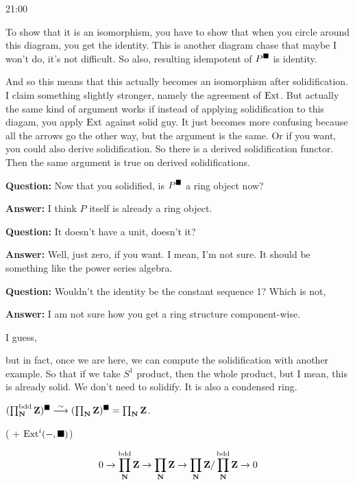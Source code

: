 \begin{unfinished}{21:00}
\begin{sketch}
To show that it is an isomorphism, you have to show that when you circle around this diagram, you get the identity. This is another diagram chase that maybe I won't do, it's not difficult. So also, resulting idempotent of $P^\blacksquare$ is identity.

And so this means that this actually becomes an isomorphism after solidification. 
I claim something slightly stronger, namely the agreement of $\operatorname{Ext}$. But actually the same kind of argument works if instead of applying solidification to this diagam, you apply $\operatorname{Ext}$ against solid guy. 
It just becomes more confusing because all the arrows go the other way, but the argument is the same. 
Or if you want, you could also derive solidification. 
So there is a derived solidification functor. Then the same argument is true on derived solidifications. 

% 
\textbf{Question:} Now that you solidified, is $P^\blacksquare$ a ring object now? 

\textbf{Answer:} I think $P$ itself is already a ring object. 

\textbf{Question:} It doesn't have a unit, doesn't it? 

\textbf{Answer:} Well, just zero, if you want. I mean, I'm not sure. It should be something like the power series algebra.

\textbf{Question:} Wouldn't the identity be the constant sequence 1? Which is not,

\textbf{Answer:}  I am not sure how you get a ring structure component-wise.


I guess, 

but in fact, once we are here, we can compute the solidification with another example. So that if we take $S^1$ product, then the whole product, but I mean, this is already solid. We don't need to solidify. It is also a condensed ring.


\begin{lemma}

$ (\prod_\mathbf N^{\mathrm{bdd}} \mathbf Z)^\blacksquare \overset\sim\longrightarrow (\prod_\mathbf N \mathbf Z)^\blacksquare = \prod_\mathbf N \mathbf Z$.

( + $\operatorname{Ext}^i(-,\blacksquare) $)
\end{lemma}

\begin{sketch}

\begin{align*}
	0 \to \prod_\mathbf N^{\mathrm{bdd}} \mathbf Z \to \prod_\mathbf N \mathbf Z \to \prod_\mathbf N \mathbf Z / \prod_\mathbf N^{\mathrm{bdd}} \mathbf Z \to 0
\end{align*}


\end{sketch}
\end{sketch}
\end{unfinished}
